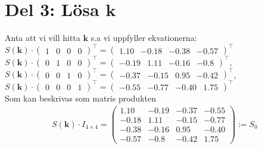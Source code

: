 \documentclass{assignment}
\begin{document}
\section*{Del 3: Lösa $\mathbf{k}$}
Anta att vi vill hitta $\mathbf{k}$ s.a vi uppfyller ekvationerna:
\\ $S(\mathbf{k})\cdot
\begin{pmatrix}
    1 & 0 & 0 & 0
\end{pmatrix}^\top = 
\begin{pmatrix}
    1.10 &-0.18&-0.38&-0.57
\end{pmatrix}^\top$
\\$S(\mathbf{k})\cdot
\begin{pmatrix}
    0&1&0&0
\end{pmatrix}^\top = 
\begin{pmatrix}
    -0.19&1.11&-0.16&-0.8
\end{pmatrix}^\top$,
\\$S(\mathbf{k})\cdot
\begin{pmatrix}
    0&0&1&0
\end{pmatrix}^\top = 
\begin{pmatrix}
    -0.37&-0.15&0.95&-0.42
\end{pmatrix}^\top$,
\\$S(\mathbf{k})\cdot
\begin{pmatrix}
    0&0&0&1
\end{pmatrix}^\top = 
\begin{pmatrix}
    -0.55&-0.77&-0.40&1.75
\end{pmatrix}^\top$
\\ Som kan beskrivas som matris produkten 
\begin{align}
    S(\mathbf{k})\cdot I_{4\times 4} = \label{orig_S_0}
        \begin{pmatrix}
            1.10&-0.19&-0.37&-0.55
            \\ -0.18&1.11&-0.15&-0.77
            \\ -0.38&-0.16&0.95&-0.40
            \\ -0.57&-0.8&-0.42&1.75
        \end{pmatrix}:=S_0
\end{align}
\end{document}
